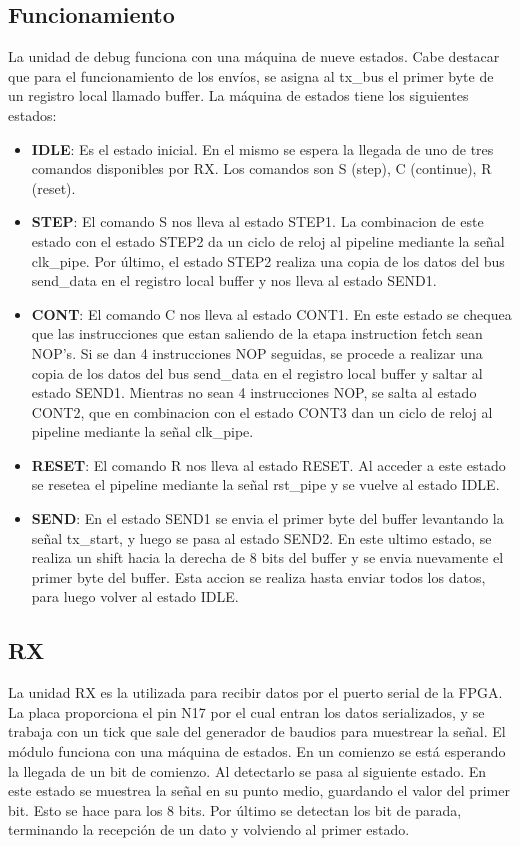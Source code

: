 \subsection{Funcionamiento}
La unidad de debug funciona con una m\'aquina de nueve estados. Cabe destacar que para el funcionamiento de los env\'ios, se asigna al tx\_bus el primer byte de un registro local llamado buffer. La m\'aquina de estados tiene los siguientes estados:
\begin{itemize}
	\item \textbf{IDLE}: Es el estado inicial. En el mismo se espera la llegada de uno de tres comandos disponibles por RX. Los comandos son S (step), C (continue), R (reset). 
	\item \textbf{STEP}: El comando S nos lleva al estado STEP1. La combinacion de este estado con el estado STEP2 da un ciclo de reloj al pipeline mediante la señal clk\_pipe. Por \'ultimo, el estado STEP2 realiza una copia de los datos del bus send\_data en el registro local buffer y nos lleva al estado SEND1.
	\item \textbf{CONT}: El comando C nos lleva al estado CONT1. En este estado se chequea que las instrucciones que estan saliendo de la etapa instruction fetch sean NOP's. Si se dan 4 instrucciones NOP seguidas, se procede a realizar una copia de los datos del bus send\_data en el registro local buffer y saltar al estado SEND1. Mientras no sean 4 instrucciones NOP, se salta al estado CONT2, que en combinacion con el estado CONT3 dan un ciclo de reloj al pipeline mediante la señal clk\_pipe.
	\item \textbf{RESET}: El comando R nos lleva al estado RESET. Al acceder a este estado se resetea el pipeline mediante la señal rst\_pipe y se vuelve al estado IDLE.
	\item \textbf{SEND}: En el estado SEND1 se envia el primer byte del buffer levantando la señal tx\_start, y luego se pasa al estado SEND2. En este ultimo estado, se realiza un shift hacia la derecha de 8 bits del buffer y se envia nuevamente el primer byte del buffer. Esta accion se realiza hasta enviar todos los datos, para luego volver al estado IDLE.
\end{itemize} 

\subsection{RX}
La unidad RX es la utilizada para recibir datos por el puerto serial de la FPGA. La placa proporciona el pin N17 por el cual entran los datos serializados, y se trabaja con un tick que sale del generador de baudios para muestrear la señal.
El m\'odulo funciona con una m\'aquina de estados. En un comienzo se est\'a esperando la llegada de un bit de comienzo. Al detectarlo se pasa al siguiente estado. En este estado se muestrea la señal en su punto medio, guardando el valor del primer bit. Esto se hace para los 8 bits. Por \'ultimo se detectan los bit de parada, terminando la recepci\'on de un dato y volviendo al primer estado.  

